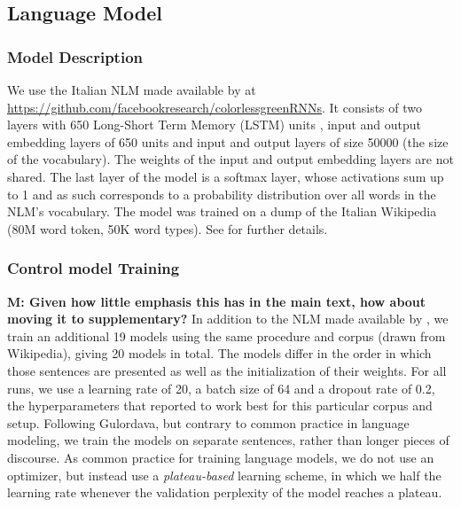 \subsection{Language Model}
\subsubsection{Model Description}
We use the Italian NLM made available by \citet{Gulordava:etal:2018} at \url{https://github.com/facebookresearch/colorlessgreenRNNs}.
It consists of two layers with 650 Long-Short Term Memory (LSTM) units \citep{Hochreiter:Schmidhuber:1997}, input and output embedding layers of 650 units and input and output layers of size 50000 (the size of the vocabulary). The weights of the input and output embedding layers are not shared.
The last layer of the model is a softmax layer, whose activations sum up to 1 and as such corresponds to a probability distribution over all words in the NLM's vocabulary. The model was trained on a dump of the Italian Wikipedia (80M word token, 50K word types). See  \citet{Gulordava:etal:2018} for further details.

\subsubsection{Control model Training} 
\textbf{M: Given how little emphasis this has in the main text, how about moving it to supplementary?} In addition to the NLM made available by \citet{Gulordava:etal:2018}, we train an additional 19 models using the same procedure and corpus (drawn from Wikipedia), giving 20 models in total. 
The models differ in the order in which those sentences are presented as well as the initialization of their weights.
For all runs, we use a learning rate of 20, a batch size of 64 and a dropout rate of 0.2, the hyperparameters that \citet{Gulordava:etal:2018} reported to work best for this particular corpus and setup.
Following Gulordava, but contrary to common practice in language modeling, we train the models on separate sentences, rather than longer pieces of discourse.
As common practice for training language models, we do not use an optimizer, but instead use a \emph{plateau-based} learning scheme, in which we half the learning rate whenever the validation perplexity of the model reaches a plateau.

